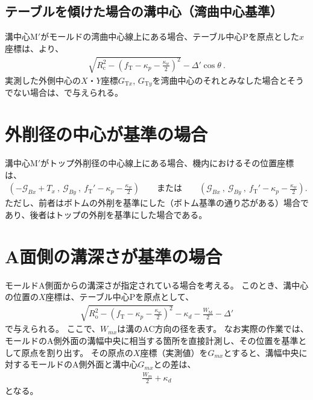 \subsection{テーブルを傾けた場合の溝中心（湾曲中心基準）}
溝中心M$'$がモールドの湾曲中心線上にある場合、テーブル中心Pを原点とした$x$座標は、より、
\begin{align*}
  \sqrt{R_\mathrm c^2-\left(f_\mathrm T-\kappa_p-\frac{\kappa_w}2\right)^{\!2}}
  -\varDelta'\cos\theta\ .
\end{align*}
実測した外側中心の$X$・$Y$座標$G_{\mathrm Tx}$, $G_{\mathrm Ty}$を湾曲中心のそれとみなした場合とそうでない場合は、で与えられる。




\clearpage
\section{外削径の中心が基準の場合}
溝中心M$'$がトップ外削径の中心線上にある場合、機内におけるその位置座標は、
\begin{align*}
  \left(
    -\mathcal G_{Bx}+T_x\ ,\
    \mathcal G_{By}\ ,\
    f_\mathrm T'-\kappa_p-\frac{\kappa_w}2
  \right) \qquad
  \text{または}\qquad
  \left(
    \mathcal G_{Bx}\ ,\
    \mathcal G_{By}\ ,\
    f_\mathrm T'-\kappa_p-\frac{\kappa_w}2
  \right).
\end{align*}
ただし、前者はボトムの外削を基準にした（ボトム基準の通り芯がある）場合であり、後者はトップの外削を基準にした場合である。




\section{A面側の溝深さが基準の場合}
モールドA側面からの溝深さが指定されている場合を考える。
このとき、溝中心の位置の$X$座標は、テーブル中心Pを原点として、
\begin{align*}
  \sqrt{R_\mathrm o^2-\left(f_\mathrm T-\kappa_p-\frac{\kappa_w}2\right)^{\!2}}-\kappa_d-\frac{W_\mathrm M}2
  -\varDelta'
\end{align*}
で与えられる。
ここで、$W_{mx}$は溝のAC方向の径を表す。
なお実際の作業では、モールドのA側外面の溝幅中央に相当する箇所を直接計測し、その位置を基準として原点を割り出す。
その原点の$X$座標（実測値）を$G_{mx}$とすると、溝幅中央に対するモールドのA側外面と溝中心$G_{mx}$との差は、
\begin{align*}
  \frac{W_m}2+\kappa_d
\end{align*}
となる。




